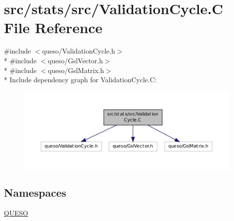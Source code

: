 \hypertarget{_validation_cycle_8_c}{\section{src/stats/src/\-Validation\-Cycle.C File Reference}
\label{_validation_cycle_8_c}
}
{\ttfamily \#include $<$queso/\-Validation\-Cycle.\-h$>$}\\*
{\ttfamily \#include $<$queso/\-Gsl\-Vector.\-h$>$}\\*
{\ttfamily \#include $<$queso/\-Gsl\-Matrix.\-h$>$}\\*
Include dependency graph for Validation\-Cycle.\-C\-:
\nopagebreak
\begin{figure}[H]
\begin{center}
\leavevmode
\includegraphics[width=350pt]{_validation_cycle_8_c__incl}
\end{center}
\end{figure}
\subsection*{Namespaces}
\begin{DoxyCompactItemize}
\item 
\hyperlink{namespace_q_u_e_s_o}{Q\-U\-E\-S\-O}
\end{DoxyCompactItemize}
